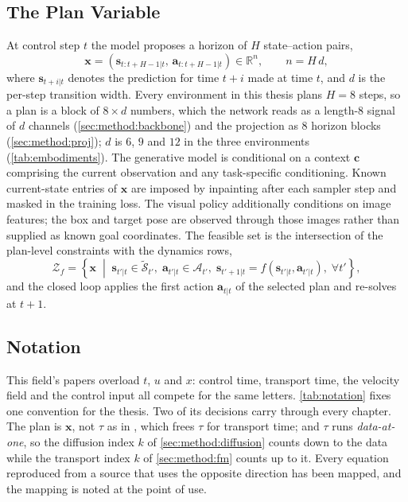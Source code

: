 \documentclass[headsepline,footsepline,footinclude=false,oneside,fontsize=11pt,paper=a4,listof=totoc,bibliography=totoc]{scrbook}
\theoremstyle{definition}
\theoremstyle{plain}
\theoremstyle{remark}
\newcommand{\vect}[1]{\boldsymbol{#1}}
\newcommand{\R}{\mathbb{R}}                    %
\newcommand{\ftime}{\tau}                      %
\begin{document}
\subsection{The Plan Variable}

At control step $t$ the model proposes a horizon of $H$ state--action pairs,
\begin{equation}\label{eq:method:plan}
  \vect{x}
  = \left(\vect{s}_{t:t+H-1|t},\,\vect{a}_{t:t+H-1|t}\right) \in \R^{n},
  \qquad n = H\,d,
\end{equation}
where $\vect{s}_{t+i|t}$ denotes the prediction for time $t+i$ made at time $t$, and $d$ is the
per-step transition width. Every environment in this thesis plans $H = 8$ steps, so a plan is a
block of $8 \times d$ numbers, which the network reads as a length-$8$ signal of $d$ channels
(\autoref{sec:method:backbone}) and the projection as $8$ horizon blocks
(\autoref{sec:method:proj}); $d$ is $6$, $9$ and $12$ in the three environments
(\autoref{tab:embodiments}). The generative model is conditional on a context
$\vect{c}$ comprising the current observation and any task-specific conditioning. Known current-state entries of
$\vect{x}$ are imposed by inpainting after each sampler step and masked in the training loss.
The visual policy additionally conditions on image features; the box and target pose are observed
through those images rather than supplied as known goal coordinates.
The feasible set is the intersection of the plan-level constraints with the dynamics rows,
\begin{equation}\label{eq:method:feasible}
  \mathcal{Z}_{f} = \left\{\vect{x} \;\middle|\;
    \vect{s}_{t'|t}\in\tilde{\mathcal{S}}_{t'},\;
    \vect{a}_{t'|t}\in\mathcal{A}_{t'},\;
    \vect{s}_{t'+1|t} = f(\vect{s}_{t'|t},\vect{a}_{t'|t}),\;
    \forall t'\right\},
\end{equation}
and the closed loop applies the first action $\vect{a}_{t|t}$ of the selected plan and re-solves
at $t+1$.

\subsection{Notation}

This field's papers overload $t$, $u$ and $x$: control time, transport time, the velocity field
and the control input all compete for the same letters. \autoref{tab:notation} fixes one
convention for the thesis. Two of its decisions carry through every chapter. The plan is
$\vect{x}$, not $\tau$ as in \parencite{romer2025diffusion}, which frees $\ftime$ for transport time;
and $\ftime$ runs \emph{data-at-one}, so the diffusion index $k$ of \autoref{sec:method:diffusion}
counts down to the data while the transport index $k$ of \autoref{sec:method:fm} counts up to it. Every
equation reproduced from a source that uses the opposite direction has been mapped, and the
mapping is noted at the point of use.
\end{document}
